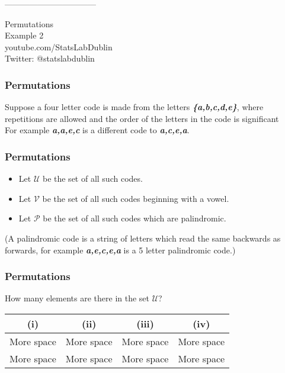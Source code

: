 \documentclass[slidemain.tex]{subfiles}
\begin{document}
 
	---------------------------------%
\begin{frame}
\begin{center}
{ \Huge
Permutations} \\{\Large Example 2}
\\
\bigskip
{ \Large
youtube.com/StatsLabDublin \\ \vspace{0.2cm} Twitter: @statslabdublin
}
\end{center}
\end{frame}


\begin{frame}
\frametitle{Permutations}
\Large
\vspace{-1.0cm}
Suppose a four letter code is made from the letters \textbf{\textit{\{a,b,c,d,e\}}}, where repetitions are allowed and the order of the letters in the code is significant\\ \bigskip For example
\textbf{\textit{a,a,e,c}} is a different code to \textbf{\textit{a,c,e,a}}.
\end{frame}


\begin{frame}

\frametitle{Permutations}
\Large
\begin{itemize}
\item Let $\mathcal{U}$ be the set of all such codes.
\item Let $\mathcal{V}$ be the set of all such codes beginning with a vowel.
\item Let $\mathcal{P}$ be the set of all such codes which are palindromic.
\end{itemize} 
\bigskip
(A palindromic code is a string of letters which read the same backwards as forwards, for example \textbf{\textit{a,e,c,e,a}} is a 5 letter palindromic code.)\\ \bigskip

\end{frame}

\begin{frame}

\frametitle{Permutations}
\Large
How many elements are there in the set $\mathcal{U}$?
\begin{center}
\begin{tabular}{|c|c|c|c|}
\hline (i) &  (ii) &  (iii) &  (iv) \\ 
\hline {\color{white}More space} &{\color{white}More space}  & {\color{white}More space} &{\color{white}More space}  \\ 
 {\color{white}More space} &{\color{white}More space}  & {\color{white}More space} &{\color{white}More space}  \\ 
\hline 
\end{tabular} 
\end{center}
\end{frame}
\end{document}
